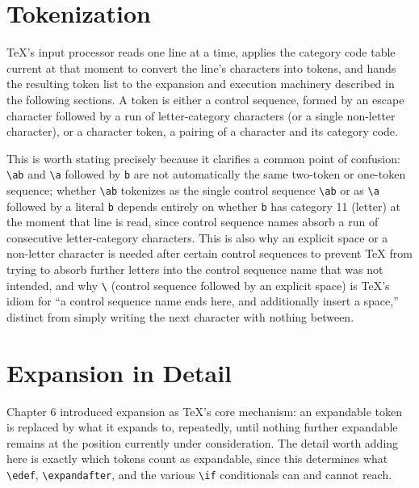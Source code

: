 \hypertarget{a.2-tokenization}{%
\section{Tokenization}\label{a.2-tokenization}}

TeX's input processor reads one line at a time, applies the category code table current at that moment to convert the line's characters into tokens, and hands the resulting token list to the expansion and execution machinery described in the following sections. A token is either a control sequence, formed by an escape character followed by a run of letter-category characters (or a single non-letter character), or a character token, a pairing of a character and its category code.

This is worth stating precisely because it clarifies a common point of confusion: \texttt{\textbackslash{}ab} and \texttt{\textbackslash{}a} followed by \texttt{b} are not automatically the same two-token or one-token sequence; whether \texttt{\textbackslash{}ab} tokenizes as the single control sequence \texttt{\textbackslash{}ab} or as \texttt{\textbackslash{}a} followed by a literal \texttt{b} depends entirely on whether \texttt{b} has category 11 (letter) at the moment that line is read, since control sequence names absorb a run of consecutive letter-category characters. This is also why an explicit space or a non-letter character is needed after certain control sequences to prevent TeX from trying to absorb further letters into the control sequence name that was not intended, and why \texttt{\textbackslash{}} (control sequence followed by an explicit space) is TeX's idiom for ``a control sequence name ends here, and additionally insert a space,'' distinct from simply writing the next character with nothing between.

\hypertarget{a.3-expansion-in-detail}{%
\section{Expansion in Detail}\label{a.3-expansion-in-detail}}

Chapter 6 introduced expansion as TeX's core mechanism: an expandable token is replaced by what it expands to, repeatedly, until nothing further expandable remains at the position currently under consideration. The detail worth adding here is exactly which tokens count as expandable, since this determines what \texttt{\textbackslash{}edef}, \texttt{\textbackslash{}expandafter}, and the various \texttt{\textbackslash{}if} conditionals can and cannot reach.

